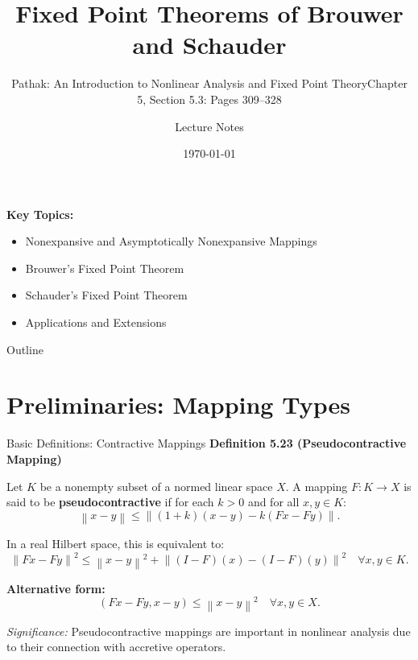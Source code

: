 \documentclass[aspectratio=169,10pt]{beamer}
\title[Fixed Point Theorems: Brouwer and Schauder]{Fixed Point Theorems of Brouwer and Schauder}
\subtitle{Pathak: An Introduction to Nonlinear Analysis and Fixed Point Theory}
\subtitle{Chapter 5, Section 5.3: Pages 309--328}
\author{Lecture Notes}
\date{\today}
\newcommand{\norm}[1]{\left\lVert#1\right\rVert}
\begin{document}
\begin{frame}
    \titlepage
    \vspace{-0.5cm}
    \begin{center}
        \textbf{Key Topics:}
        \begin{itemize}
            \item Nonexpansive and Asymptotically Nonexpansive Mappings
            \item Brouwer's Fixed Point Theorem
            \item Schauder's Fixed Point Theorem
            \item Applications and Extensions
        \end{itemize}
    \end{center}
\end{frame}

\begin{frame}{Outline}
    \tableofcontents
\end{frame}

\section{Preliminaries: Mapping Types}

\begin{frame}{Basic Definitions: Contractive Mappings}
    \textbf{Definition 5.23 (Pseudocontractive Mapping)}

    Let $K$ be a nonempty subset of a normed linear space $X$. A mapping $F: K \to X$ is said to be \textbf{pseudocontractive} if for each $k > 0$ and for all $x, y \in K$:
    \[
        \norm{x - y} \leq \norm{(1 + k)(x - y) - k(Fx - Fy)}.
    \]

    \vspace{0.3cm}
    In a real Hilbert space, this is equivalent to:
    \[
        \norm{Fx - Fy}^2 \leq \norm{x - y}^2 + \norm{(I - F)(x) - (I - F)(y)}^2 \quad \forall x, y \in K.
    \]

    \vspace{0.3cm}
    \textbf{Alternative form:}
    \[
        (Fx - Fy, x - y) \leq \norm{x - y}^2 \quad \forall x, y \in X.
    \]

    \vspace{0.2cm}
    \emph{Significance:} Pseudocontractive mappings are important in nonlinear analysis due to their connection with accretive operators.
\end{frame}
\end{document}
